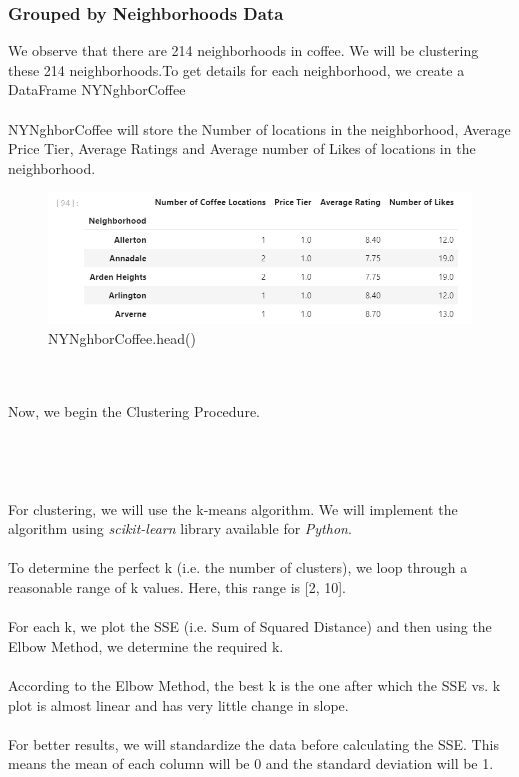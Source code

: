 \documentclass{article}
\begin{document}
\subsubsection{Grouped by Neighborhoods Data}
{We observe that there are 214 neighborhoods in coffee. We will be clustering these 214 neighborhoods.To get details for each neighborhood, we create a DataFrame NYNghborCoffee}\\\\
{NYNghborCoffee will store the Number of locations in the neighborhood, Average Price Tier, Average Ratings and Average number of Likes of locations in the neighborhood.}
\begin{figure}[h]
\caption{NYNghborCoffee.head()}
\centering
\includegraphics[width=\textwidth]{images/Screenshot (40).png}
\end{figure}
\\\\
{Now, we begin the Clustering Procedure.}
\\\\\\\\\\
{For clustering, we will use the k-means algorithm. We will implement the algorithm using \textit{scikit-learn} library available for \textit{Python}.}\\\\
{To determine the perfect k (i.e. the number of clusters), we loop through a reasonable range of k values. Here, this range is [2, 10].}\\\\
{For each k, we plot the SSE (i.e. Sum of Squared Distance) and then using the Elbow Method, we determine the required k.}\\\\
{According to the Elbow Method, the best k is the one after which the SSE vs. k plot is almost linear and has very little change in slope.}\\\\
{For better results, we will standardize the data before calculating the SSE. This means the mean of each column will be 0 and the standard deviation will be 1.}
\end{document}

